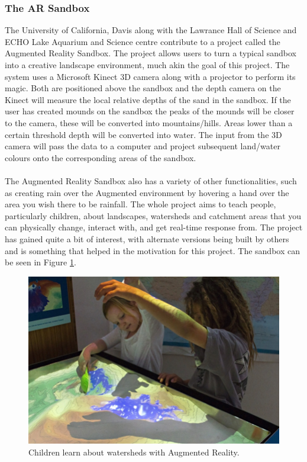 \documentclass[11pt]{article}
\begin{document}
\subsubsection{The AR Sandbox}
The University of California, Davis along with the Lawrance Hall of Science 
and ECHO Lake Aquarium and Science centre contribute to a project called the
Augmented Reality Sandbox\cite{Reed14}. The project allows users to turn a 
typical sandbox
into a creative landscape environment, much akin the goal of this project.
The system uses a Microsoft Kinect 3D camera along with a projector to 
perform its magic. Both are positioned above the sandbox and the depth 
camera on the Kinect
will measure the local relative depths of the sand in the sandbox. If the
user has created mounds on the sandbox the peaks of the mounds
will be closer to the camera, these will be converted into mountains/hills. 
Areas lower than a certain threshold 
depth will be converted into water. The input from the 3D camera will pass 
the data to a computer and project subsequent land/water colours onto the
corresponding areas of the sandbox.\\
\\
The Augmented Reality Sandbox also has a variety of other functionalities, such
as creating rain over the Augmented environment by hovering a hand over the 
area you wish there to be rainfall. The whole project aims to teach people, 
particularly children, about landscapes, watersheds and catchment areas 
that you can physically change, interact with, and get real-time response 
from. The project has gained quite a bit of interest, with alternate 
versions being built by others and is something that helped in the 
motivation for this project. The sandbox can be seen in Figure \ref{arsandbox}. \\

\begin{figure}[!h]
	\centering
	\includegraphics[scale=0.8]{pics/sandbox.jpg}
	\caption{Children learn about watersheds with Augmented Reality.}
	\label{arsandbox}
\end{figure}
\end{document}
